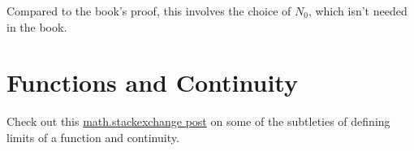 \documentclass{article}
\begin{document}
Compared to the book's proof, this involves the choice of $N_0$, which isn't needed in the book.


\section{Functions and Continuity}
Check out this \href{https://math.stackexchange.com/questions/455296/can-a-function-with-just-one-point-in-its-domain-be-continuous}{math.stackexchange post} on some of the subtleties of defining limits of a function and continuity. 
\end{document}
